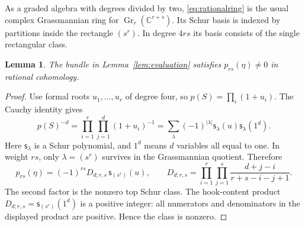 \documentclass[11pt]{article}
\newtheorem{lemma}[theorem]{Lemma}
\theoremstyle{definition}
\newcommand{\C}{\mathbb C}
\newcommand{\Gr}{\operatorname{Gr}}
\newcommand{\Sch}{\mathsf{s}}
\begin{document}
As a graded algebra with degrees divided by two, \eqref{eq:rationalring} is the usual complex Grassmannian ring for $\Gr_r(\C^{r+s})$. Its Schur basis is indexed by partitions inside the rectangle $(s^r)$. In degree $4rs$ its basis consists of the single rectangular class.

\begin{lemma}\label{lem:ptop}
The bundle in Lemma~\ref{lem:evaluation} satisfies $p_{rs}(\eta)\neq0$ in rational cohomology.
\end{lemma}
\begin{proof}
Use formal roots $u_1,\ldots,u_r$ of degree four, so $p(S)=\prod_i(1+u_i)$. The Cauchy identity gives
\[
 p(S)^{-d}=\prod_{i=1}^r\prod_{j=1}^d(1+u_i)^{-1}
 =\sum_\lambda(-1)^{|\lambda|}\Sch_\lambda(u)\Sch_\lambda(1^d).
\]
Here $\Sch_\lambda$ is a Schur polynomial, and $1^d$ means $d$ variables all equal to one. In weight $rs$, only $\lambda=(s^r)$ survives in the Grassmannian quotient. Therefore
\begin{equation}\label{eq:topcoefficient}
 p_{rs}(\eta)=(-1)^{rs}D_{d;r,s}\,\Sch_{(s^r)}(u),\qquad
 D_{d;r,s}=\prod_{i=1}^r\prod_{j=1}^s
 \frac{d+j-i}{r+s-i-j+1}.
\end{equation}
The second factor is the nonzero top Schur class. The hook-content product $D_{d;r,s}=\Sch_{(s^r)}(1^d)$ is a positive integer: all numerators and denominators in the displayed product are positive. Hence the class is nonzero.
\end{proof}
\end{document}
